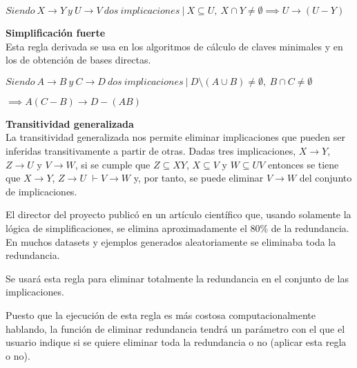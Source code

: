 \begin{center}
    \(Siendo \ X \to Y \ y \ U\to V \ dos \ implicaciones \ | \ X \subseteq U, \ X \cap Y \neq \emptyset \implies U \to (U - Y)\)
\end{center}


\bigskip

% 
\textbf{Simplificaci\'on fuerte}\\

Esta regla derivada se usa en los algoritmos de c\'alculo de claves minimales y en los de obtenci\'on de bases directas. 
\begin{center}
    \(Siendo \ A \to B \ y \ C\to D \ dos \ implicaciones \ | \ D \setminus (A \cup B) \neq \emptyset, \ B \cap C \neq \emptyset\)
\end{center}

\begin{center}
    \(\implies A(C-B) \to D - (AB)\)
\end{center}


\bigskip

\textbf{Transitividad generalizada}\\

La transitividad generalizada nos permite eliminar implicaciones que pueden ser inferidas transitivamente a partir de otras. Dadas tres implicaciones, \(X \to Y\), \(Z \to U\) y \(V \to W\), si se cumple que \(Z \subseteq XY \), \( X \subseteq V \) y \( W \subseteq UV \) entonces se tiene que  \(X \to Y\), \(Z \to U\) \( \vdash V \to W\) y, por tanto, se puede eliminar \(V \to W\) del conjunto de implicaciones.

El director del proyecto public\'o en un art\'iculo cient\'ifico que, usando solamente la l\'ogica de simplificaciones, se elimina aproximadamente el 80\% de la redundancia. En muchos datasets y ejemplos generados aleatoriamente se eliminaba toda la redundancia. 

Se usar\'a esta regla para eliminar totalmente la redundancia en el conjunto de las implicaciones. 

Puesto que la ejecuci\'on de esta regla es m\'as costosa computacionalmente hablando, la funci\'on de eliminar redundancia tendr\'a un par\'ametro con el que el usuario indique si se quiere eliminar toda la redundancia o no (aplicar esta regla o no).\\

\newpage

\newpage
